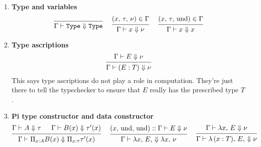 \documentclass{article}
\begin{document}

\begin{enumerate}
\item \textbf{Type and variables}
  \begin{gather*}
    \begin{prooftree}
      \infer0{\Gamma \vdash \Type \Downarrow \Type} 
    \end{prooftree}
   ~ \quad
    \begin{prooftree}
      \hypo{(x, \, \tau, \, \nu) \in \Gamma}
      \infer1{\Gamma \vdash x \Downarrow \nu}
    \end{prooftree} 
    ~ \quad
    \begin{prooftree}
      \hypo{(x, \, \tau, \, \text{und}) \in \Gamma}
      \infer1{\Gamma \vdash x \Downarrow x}
    \end{prooftree}
  \end{gather*}

\item \textbf{Type ascriptions} \\
  \[
    \begin{prooftree}
      \hypo{\Gamma \vdash E \Downarrow \nu}
      \infer1{\Gamma \vdash (E : T) \Downarrow \nu}
    \end{prooftree}
  \]
  This says type ascriptions do not play a role in computation. They're just
  there to tell the typechecker to ensure that $E$ really has the prescribed type
  $T$.

 \item \textbf{Pi type constructor and data constructor} \\
  \begin{gather*}
    \begin{prooftree}
      \hypo{\Gamma \vdash A \Downarrow \tau}
      \hypo{\Gamma \vdash B(x) \Downarrow \tau'(x)}
      \infer2{\Gamma \vdash \Pi_{x : A} B(x) \Downarrow \Pi_{x : \tau} \tau'(x)}
    \end{prooftree}
    ~ \quad
    \begin{prooftree}
      \hypo{(x, \, \text{und}, \, \text{und}) :: \Gamma \vdash E \Downarrow \nu}
      \infer1{\Gamma \vdash \lambda x, \, E, \, \Downarrow \lambda x, \, \nu}
    \end{prooftree}
    ~ \quad
    \begin{prooftree}
      \hypo{\Gamma \vdash \lambda x, \, E \Downarrow \nu}
      \infer1{\Gamma \vdash \lambda \, (x : T), \, E, \, \Downarrow \nu}
    \end{prooftree}
  \end{gather*}
 

\end{enumerate}
\end{document}
